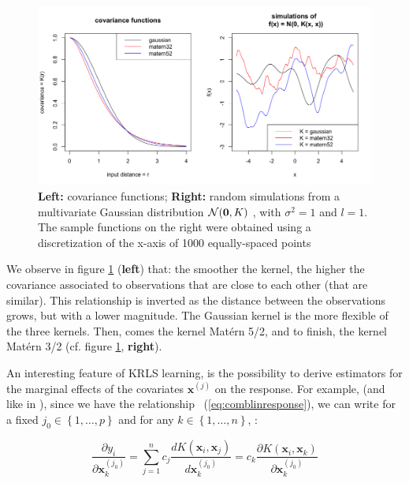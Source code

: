 \begin{figure}[!htb]
\centering
\includegraphics[width=14cm]{gfx/chapter-krls-models/covariance_functions.png}
\caption{\textbf{Left:} covariance functions; \textbf{Right:} random simulations from a multivariate Gaussian distribution $\mathcal{N}(\textbf{0}, K)$ , with $\sigma^2 = 1$ and $l = 1$. The sample functions on the right were obtained using a discretization of the x-axis of 1000 equally-spaced points}
\label{cov_functions}
\end{figure}

We observe in figure \ref{cov_functions} (\textbf{left}) that: the smoother the kernel, the higher the covariance associated to observations that are close to each other (that are similar). This relationship is inverted as the distance between the observations grows, but with a lower magnitude. The Gaussian kernel is the more flexible of the three kernels. Then, comes the kernel Mat\'ern 5/2, and to finish, the kernel Mat\'ern 3/2 (cf. figure \ref{cov_functions}, \textbf{right}).

An interesting feature of KRLS learning, is the possibility to derive estimators for the  marginal effects of the covariates $\textbf{x}^{(j)}$ on the response. For example, (and like in \cite{ferwerda2017kernel}), since we have the relationship ~(\ref{eq:comblinresponse}), we can write for a fixed $j_0 \in \left \lbrace 1, \ldots, p \right \rbrace$ and for any $k \in \left \lbrace 1, \ldots, n \right \rbrace $, :

\begin{equation}
\frac{\partial y_i}{\partial \textbf{x}_k^{(j_0)}} = \sum_{j = 1}^n c_j \frac{d K(\textbf{x}_i, \textbf{x}_j)}{d \textbf{x}_k^{(j_0)}} = c_k \frac{\partial K(\textbf{x}_i, \textbf{x}_k)}{\partial \textbf{x}_k^{(j_0)}}
\end{equation}

